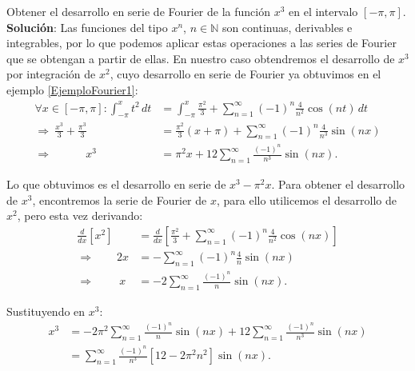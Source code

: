 \begin{ejemplo}
Obtener el desarrollo en serie de Fourier de la función $x^3$ en el intervalo $[-\pi,\pi]$.
\\

\textbf{Solución}: Las funciones del tipo $x^n$, $n \in \mathbb{N}$ son continuas, derivables e integrables, por lo que podemos aplicar estas operaciones a las series de Fourier que se obtengan a partir de ellas.  En nuestro caso obtendremos el desarrollo de $x^3$ por integración de $x^2$, cuyo desarrollo en serie de Fourier ya obtuvimos en el ejemplo \ref{EjemploFourier1}:
\begin{align*}
   \forall x \in [-\pi,\pi]:  \int_{-\pi}^x t^2 \,dt &=   \int_{-\pi}^x   \frac{\pi^2}{3} + \sum_{n=1}^{\infty} (-1)^n \frac{4}{n^2} \cos(nt) \,dt\\
    \Rightarrow ~ \frac{x^3}{3} + \frac{\pi^3}{3} &=  \frac{\pi^2}{3} (x+\pi) + \sum_{n=1}^{\infty} (-1)^n \frac{4 }{n^3}  \sin(nx)  \\
\Rightarrow \qquad \quad    x^3 &= \pi^2 x + 12 \sum_{n=1}^{\infty} \frac{(-1)^n}{n^3} \sin(nx).
\end{align*}

Lo que obtuvimos es el desarrollo en serie de $x^3-\pi^2 x$. Para obtener el desarrollo de $x^3$, encontremos la serie de Fourier de $x$, para ello utilicemos el desarrollo de $x^2$, pero esta vez derivando:
\begin{align*}
    \frac{d}{dx} [x^2] &= \frac{d}{dx} \left[  \frac{\pi^2}{3} + \sum_{n=1}^{\infty} (-1)^n \frac{4}{n^2} \cos(nx)\right] \\
   \Rightarrow \qquad 2x &= - \sum_{n=1}^{\infty} (-1)^n \frac{4}{n} \sin(nx) \\
   \Rightarrow \qquad ~ x &= - 2 \sum_{n=1}^{\infty}  \frac{(-1)^n}{n} \sin(nx).
\end{align*}

Sustituyendo en $x^3$:
\begin{align*}
    x^3 &= -2 \pi^2 \sum_{n=1}^{\infty}  \frac{(-1)^n}{n} \sin(nx) + 12 \sum_{n=1}^{\infty} \frac{(-1)^n}{n^3} \sin(nx) \\
    &= \sum_{n=1}^{\infty} \frac{(-1)^n}{n^3} \left[ 12 - 2\pi^2 n^2 \right] \sin(nx).
\end{align*}
\end{ejemplo}



